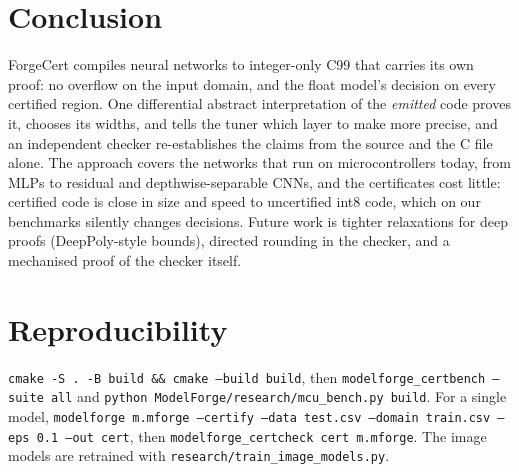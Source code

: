 \documentclass[conference]{IEEEtran}
\begin{document}
\section{Conclusion}
ForgeCert compiles neural networks to integer-only C99 that carries its own proof: no overflow on the input domain, and the float model's decision on every certified region. One differential abstract interpretation of the \emph{emitted} code proves it, chooses its widths, and tells the tuner which layer to make more precise, and an independent checker re-establishes the claims from the source and the C file alone. The approach covers the networks that run on microcontrollers today, from MLPs to residual and depthwise-separable CNNs, and the certificates cost little: certified code is close in size and speed to uncertified int8 code, which on our benchmarks silently changes decisions. Future work is tighter relaxations for deep proofs (DeepPoly-style bounds), directed rounding in the checker, and a mechanised proof of the checker itself.

\section*{Reproducibility}
\texttt{cmake -S . -B build \&\& cmake --build build}, then \texttt{modelforge\_certbench --suite all} and \texttt{python ModelForge/research/mcu\_bench.py build}. For a single model, \texttt{modelforge m.mforge --certify --data test.csv --domain train.csv --eps 0.1 --out cert}, then \texttt{modelforge\_certcheck cert m.mforge}. The image models are retrained with \texttt{research/train\_image\_models.py}.





\end{document}
